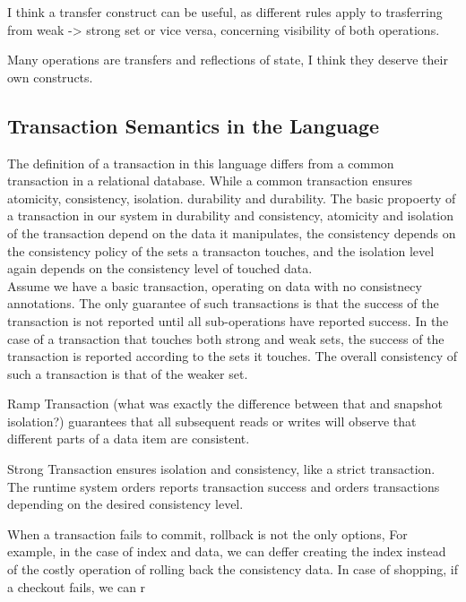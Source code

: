 I think a transfer construct can be useful, as different rules apply to
trasferring from weak -> strong set or vice versa, concerning visibility of both
operations. 

Many operations are transfers and reflections of state, I think they deserve
their own constructs. 

\subsection{Transaction Semantics in the Language}
The definition of a transaction in this language differs from a common transaction in a
relational database. While a common transaction ensures atomicity, consistency, isolation.
durability and durability. The basic propoerty of a transaction in our system in
durability and consistency, atomicity and isolation of the transaction depend on
the data it manipulates, the consistency depends on the consistency policy of
the sets a transacton touches, and the isolation level again depends on the
consistency level of touched data. \\

Assume we have a basic transaction, operating on data with no consistnecy
annotations. The only guarantee of such transactions is that the success of the
transaction is not reported until all sub-operations have reported success. In
the case of a transaction that touches both strong and weak sets, the success
of the transaction is reported according to the sets it touches. The overall
consistency of such a transaction is that of the weaker set. 

Ramp Transaction (what was exactly the difference between that and snapshot
isolation?) guarantees that all subsequent reads or writes will observe that
different parts of a data item are consistent.

Strong Transaction ensures isolation and consistency, like a strict transaction. 
The runtime system orders reports transaction success and orders transactions depending on the desired consistency
level.

When a transaction fails to commit, rollback is not the only options, For
example, in the case of index and data, we can deffer creating the index instead
of the costly operation of rolling back the consistency data. In case of
shopping, if a checkout fails, we can r




